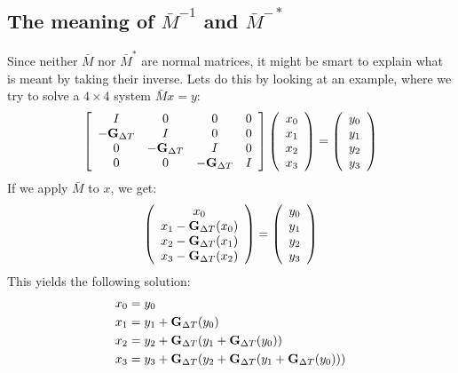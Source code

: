 \subsection{The meaning of $\bar{M}^{-1}$ and $\bar{M}^{-*}$}
Since neither $\bar{M}$ nor $\bar{M}^{*}$ are normal matrices, it might be smart to explain what is meant by taking their inverse. Lets do this by looking at an example, where we try to solve a $4\times 4$ system $\bar{M}x = y$:
\begin{align}
\left[ \begin{array}{cccc}
   I & 0 & 0 & 0 \\  
   -\bold{G}_{\Delta T} & I & 0 & 0 \\ 
   0 &-\bold{G}_{\Delta T} & I  & 0 \\
   0 &0 &-\bold{G}_{\Delta T} & I   \\
   \end{array}  \right]
   \left( \begin{array}{c}
   x_0 \\
   x_1 \\
   x_2 \\
   x_3 \\
   \end{array} \right) =
   \left( \begin{array}{c}
   y_0 \\
   y_1 \\
   y_2 \\
   y_3 \\
   \end{array} \right)	
\end{align}  
If we apply $\bar{M}$ to $x$, we get:
\begin{align}
\left( \begin{array}{c}
   x_0 \\
   x_1 -\bold{G}_{\Delta T}(x_0) \\
   x_2 -\bold{G}_{\Delta T}(x_1)\\
   x_3 -\bold{G}_{\Delta T}(x_2)\\
   \end{array} \right) =
   \left( \begin{array}{c}
   y_0 \\
   y_1 \\
   y_2 \\
   y_3 \\
   \end{array} \right)
\end{align}
This yields the following solution:
\begin{align*}
x_0 &=y_0 \\
x_1 &=y_1 + \bold{G}_{\Delta T}(y_0) \\
x_2 &=y_2 + \bold{G}_{\Delta T}(y_1 + \bold{G}_{\Delta T}(y_0)) \\
x_3 &=y_3 + \bold{G}_{\Delta T}(y_2 + \bold{G}_{\Delta T}(y_1 + \bold{G}_{\Delta T}(y_0))) 
\end{align*}
